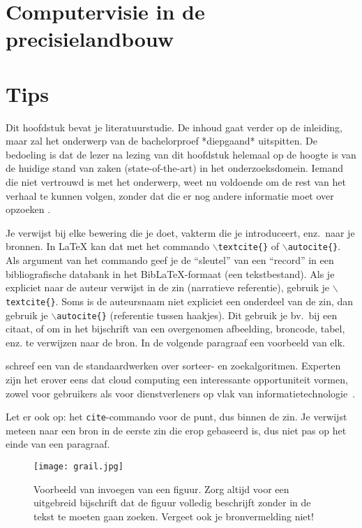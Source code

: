 \section{Computervisie in de precisielandbouw}




\section{Tips}

Dit hoofdstuk bevat je literatuurstudie. De inhoud gaat verder op de inleiding, maar zal het onderwerp van de bachelorproef *diepgaand* uitspitten. De bedoeling is dat de lezer na lezing van dit hoofdstuk helemaal op de hoogte is van de huidige stand van zaken (state-of-the-art) in het onderzoeksdomein. Iemand die niet vertrouwd is met het onderwerp, weet nu voldoende om de rest van het verhaal te kunnen volgen, zonder dat die er nog andere informatie moet over opzoeken \autocite{Pollefliet2011}.

Je verwijst bij elke bewering die je doet, vakterm die je introduceert, enz.\ naar je bronnen. In \LaTeX{} kan dat met het commando \texttt{$\backslash${textcite\{\}}} of \texttt{$\backslash${autocite\{\}}}. Als argument van het commando geef je de ``sleutel'' van een ``record'' in een bibliografische databank in het Bib\LaTeX{}-formaat (een tekstbestand). Als je expliciet naar de auteur verwijst in de zin (narratieve referentie), gebruik je \texttt{$\backslash${}textcite\{\}}. Soms is de auteursnaam niet expliciet een onderdeel van de zin, dan gebruik je \texttt{$\backslash${}autocite\{\}} (referentie tussen haakjes). Dit gebruik je bv.~bij een citaat, of om in het bijschrift van een overgenomen afbeelding, broncode, tabel, enz. te verwijzen naar de bron. In de volgende paragraaf een voorbeeld van elk.

\textcite{Knuth1998} schreef een van de standaardwerken over sorteer- en zoekalgoritmen. Experten zijn het erover eens dat cloud computing een interessante opportuniteit vormen, zowel voor gebruikers als voor dienstverleners op vlak van informatietechnologie~\autocite{Creeger2009}.

Let er ook op: het \texttt{cite}-commando voor de punt, dus binnen de zin. Je verwijst meteen naar een bron in de eerste zin die erop gebaseerd is, dus niet pas op het einde van een paragraaf.

\begin{figure}
    \centering
    \texttt{[image: grail.jpg]}
    \caption[Voorbeeld figuur.]{\label{fig:grail}Voorbeeld van invoegen van een figuur. Zorg altijd voor een uitgebreid bijschrift dat de figuur volledig beschrijft zonder in de tekst te moeten gaan zoeken. Vergeet ook je bronvermelding niet!}
\end{figure}